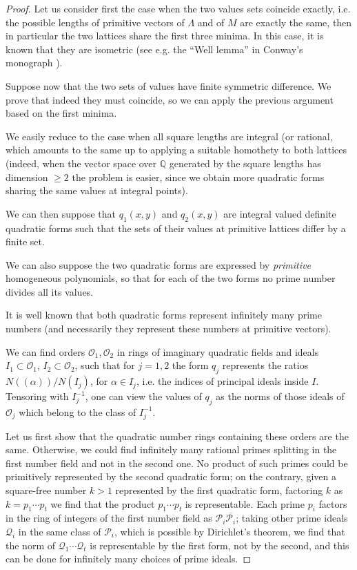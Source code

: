 \documentclass[leqno,12pt]{article} %
\def\Q{{{\mathbb Q}}}
\theoremstyle{plain} %
\theoremstyle{definition} %
\begin{document}
 



\begin{proof} 

Let us consider first the case when the two values sets coincide exactly, i.e. the possible lengths of primitive vectors of $\Lambda$ and of $M$ are exactly the same, then  in particular the two lattices share the first three minima. In this case, it is known that they are isometric (see e.g. the ``Well lemma'' in {\sc Conway}'s monograph \cite{Conway}).  


Suppose now that the two sets of values have finite symmetric difference. We prove that indeed they must coincide, so we can apply the previous argument based on the first minima.


We easily reduce to the case when all square lengths are integral (or rational, which amounts to the same up to applying a suitable homothety to both lattices (indeed,  when the vector space over $\Q$ generated by the square lengths has dimension $\geq 2$ the problem is easier, since we obtain more quadratic forms sharing the same values at integral points).

We can then suppose that $q_1(x,y)$ and $q_2(x,y)$ are integral valued definite quadratic forms such that the sets of their values at primitive lattices differ by a finite set.

We can also suppose the two quadratic forms are expressed by   {\it primitive} homogeneous polynomials, so that for each of the two forms no prime number divides all its values. 

It is well known that both quadratic forms represent infinitely many prime numbers (and necessarily they represent these numbers at primitive vectors). 


We can find orders $\mathcal{O}_1,\mathcal{O}_2$ in rings of imaginary quadratic fields and ideals $I_1\subset \mathcal{O}_1$, $I_2\subset\mathcal{O}_2$, such that for $j=1,2$ the form $q_j$ represents the ratios $N((\alpha))/N(I_j)$, for $\alpha\in I_j$, i.e. the indices of principal ideals inside $I$. Tensoring with $I_j^{-1}$, one can view the values of $q_j$ as the norms of those ideals of $\mathcal{O}_j$ which belong to the class  of $I_j^{-1}$. 

 Let us first show that the quadratic number rings containing these orders are the same. Otherwise, we could find infinitely many rational primes splitting in the first number field and not in the second one. No product of such primes could be primitively represented by the second quadratic form; on the contrary, given a square-free number  $k>1$ represented by the first quadratic form,  factoring $k$ as $k=p_1\cdots p_t$ we find that the product $p_1\cdots p_t$ is representable. Each prime $p_i$ factors in the ring of integers of the first number field as $\mathcal{P}_i\overline{\mathcal{P}_i}$; taking other prime ideals $\mathcal{Q}_i$ in the same class of $\mathcal{P}_i$, which is possible by Dirichlet's theorem, we find that the norm of $\mathcal{Q}_1\cdots \mathcal{Q}_t$ is representable by the first form, not by the second, and this can be done for infinitely many choices of prime ideals.
 

\end{proof}
\end{document}
